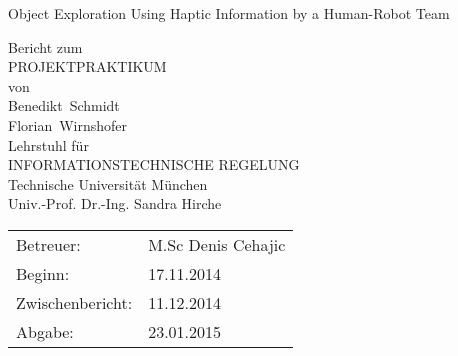 \documentclass[a4paper,twoside, openright,12pt]{report}
\begin{document}
	\pagestyle{empty}
	\enlargethispage{4.5cm} %
	\begin{center}
	\phantom{u}
	\vspace{0.5cm}
	\Huge{\sc Object Exploration Using Haptic Information by a Human-Robot Team}\\
	\vspace{1.5cm}
	
	                                 \large{Bericht zum\\
									PROJEKTPRAKTIKUM \\
						   von\\          
	
							\vspace{0.4cm}
						Benedikt~Schmidt\\
						\vspace{0.2cm}
						Florian~Wirnshofer\\
							\vspace{4cm}
						Lehrstuhl f\"ur\\
						INFORMATIONSTECHNISCHE REGELUNG \\
						Technische Universit\"at M\"unchen\\
						\vspace{0.6cm}
	                    Univ.-Prof. Dr.-Ing. Sandra Hirche}
	\end{center}
	\vspace{4.0cm}
	\begin{tabular}{ll}
	Betreuer: & M.Sc Denis Cehajic\\
	Beginn: & 17.11.2014  \\
	Zwischenbericht: &  11.12.2014  \\
	Abgabe: &  23.01.2015 \\
	\end{tabular}
	
	\cleardoublepage
	
	\phantom{u}
	
\end{document}
